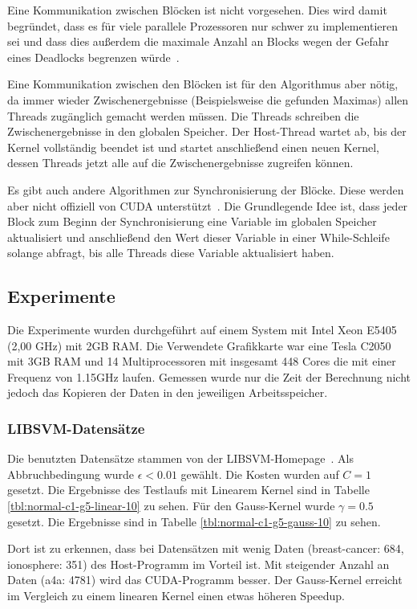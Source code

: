 \documentclass[ngerman]{scrartcl}
\begin{document}
Eine Kommunikation zwischen Blöcken ist nicht vorgesehen.
Dies wird damit begründet, dass es für viele parallele Prozessoren nur schwer zu implementieren sei und dass dies außerdem die maximale Anzahl an Blocks wegen der Gefahr eines Deadlocks begrenzen würde~\cite{parallelreduction}.

Eine Kommunikation zwischen den Blöcken ist für den Algorithmus aber nötig, da immer wieder Zwischenergebnisse (Beispielsweise die gefunden Maximas) allen Threads zugänglich gemacht werden müssen.
Die Threads schreiben die Zwischenergebnisse in den globalen Speicher. Der Host-Thread wartet ab, bis der Kernel vollständig beendet ist und startet anschließend einen neuen Kernel, dessen Threads jetzt alle auf die Zwischenergebnisse zugreifen können.

Es gibt auch andere Algorithmen zur Synchronisierung der Blöcke. Diese werden aber nicht offiziell von CUDA unterstützt~\cite{interblockgpusync}.
Die Grundlegende Idee ist, dass jeder Block zum Beginn der Synchronisierung eine Variable im globalen Speicher aktualisiert und anschließend den Wert dieser Variable in einer While-Schleife solange abfragt, bis alle Threads diese Variable aktualisiert haben.
\subsection{Experimente}
Die Experimente wurden durchgeführt auf einem System mit Intel Xeon E5405 (2,00 GHz) mit 2GB RAM. 
Die Verwendete Grafikkarte war eine Tesla C2050 mit 3GB RAM und 14 Multiprocessoren mit insgesamt 448 Cores die mit einer Frequenz von 1.15GHz laufen. Gemessen wurde nur die Zeit der Berechnung nicht jedoch das Kopieren der Daten in den jeweiligen Arbeitsspeicher.

\subsubsection{LIBSVM-Datensätze}
Die benutzten Datensätze stammen von der LIBSVM-Homepage~\cite{libsvm-data}. Als Abbruchbedingung wurde $\epsilon < 0.01$ gewählt. Die Kosten wurden auf $C=1$ gesetzt. Die Ergebnisse des Testlaufs mit Linearem Kernel sind in Tabelle \ref{tbl:normal-c1-g5-linear-10} zu sehen. Für den Gauss-Kernel wurde $\gamma=0.5$ gesetzt. Die Ergebnisse sind in Tabelle \ref{tbl:normal-c1-g5-gauss-10} zu sehen.

Dort ist zu erkennen, dass bei Datensätzen mit wenig Daten (breast-cancer: 684, ionosphere: 351) des Host-Programm im Vorteil ist. Mit steigender Anzahl an Daten (a4a: 4781) wird das CUDA-Programm besser.
Der Gauss-Kernel erreicht im Vergleich zu einem linearen Kernel einen etwas höheren Speedup.
\end{document}
